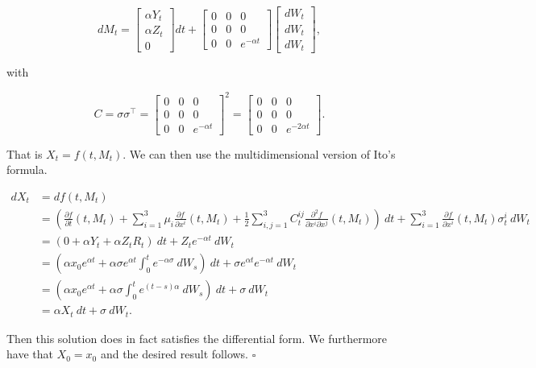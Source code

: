 \documentclass[
]{article}
\begin{document}
\[
dM_t=\begin{bmatrix}\alpha Y_t\\ \alpha Z_t\\ 0\end{bmatrix}dt+\begin{bmatrix}0 &0  &0 \\ 0 & 0 &0 \\ 0 & 0 & e^{-\alpha t}\end{bmatrix}\begin{bmatrix}dW_t\\ dW_t\\ dW_t\end{bmatrix},
\]

with

\[
C=\sigma \sigma^\top =\begin{bmatrix}0 &0  &0 \\ 0 & 0 &0 \\ 0 & 0 & e^{-\alpha t}\end{bmatrix}^2=\begin{bmatrix}0 &0  &0 \\ 0 & 0 &0 \\ 0 & 0 & e^{-2\alpha t}\end{bmatrix}.
\]

That is \(X_t=f(t,M_t)\). We can then use the multidimensional version
of Ito's formula.

\begin{align*}
dX_t&=df(t,M_t)\\
&=\left(\frac{\partial f}{\partial t}(t,M_t)+\sum_{i=1}^3\mu_i \frac{\partial f}{\partial x^i}(t,M_t)+\frac{1}{2}\sum_{i,j=1}^3 C^{ij}_t\frac{\partial^2 f}{\partial x^i\partial x^j}(t,M_t)\right)\ dt + \sum_{i=1}^3 \frac{\partial f}{\partial x^i}(t,M_t) \sigma^i_t\ dW_t\\
&=\left(0+\alpha Y_t+\alpha Z_t R_t\right)\ dt + Z_te^{-\alpha t}\ dW_t\\
&=\left(\alpha x_0e^{\alpha t}+\alpha \sigma e^{\alpha t} \int_0^t e^{-\alpha \sigma}\ dW_s\right)\ dt + \sigma e^{\alpha t}e^{-\alpha t}\ dW_t\\
&=\left(\alpha x_0e^{\alpha t}+\alpha \sigma  \int_0^t e^{(t-s)\alpha }\ dW_s\right)\ dt + \sigma \ dW_t\\
&=\alpha X_t\ dt + \sigma \ dW_t.
\end{align*}

Then this solution does in fact satisfies the differential form. We
furthermore have that \(X_0=x_0\) and the desired result follows.
\(\square\)
\end{document}
